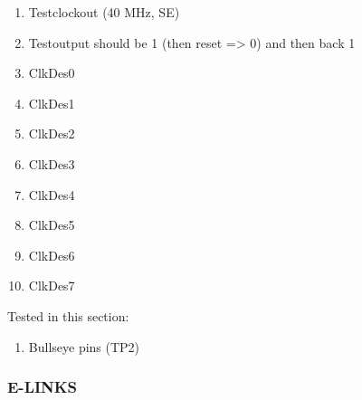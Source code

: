 \begin{enumerate}
    \item Testclockout (40 MHz, SE)
    \item Testoutput should be 1 (then reset => 0) and then back 1
    \item ClkDes0
    \item ClkDes1
    \item ClkDes2
    \item ClkDes3
    \item ClkDes4
    \item ClkDes5
    \item ClkDes6
    \item ClkDes7
\end{enumerate}

Tested in this section:
\begin{enumerate}
    \item Bullseye pins (TP2)
\end{enumerate}

\subsubsection{E-LINKS}

